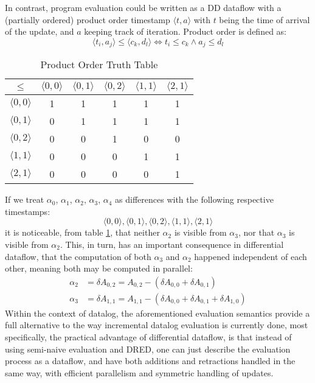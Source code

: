 \documentclass[sigconf,screen,review=false,natbib]{acmart}
\theoremstyle{definition}
\begin{document}
In contrast, program evaluation could be written as a DD dataflow with a (partially ordered) product order timestamp $\langle  t, a \rangle$
with $t$ being the time of arrival of the update, and $a$ keeping track of iteration. Product order is defined as: \[\langle t_i, a_j \rangle \leq \langle c_k, d_l \rangle \iff t_i \leq c_k \wedge a_j \leq d_l\]
\begin{table}
	\caption{Product Order Truth Table}
	\begin{tabular}{|c|c|c|c|c|c|}
		\hline
		$\leq$                 & $\langle 0, 0 \rangle$ & $\langle 0, 1 \rangle$ & $\langle 0, 2 \rangle$ & $\langle 1, 1 \rangle$ & $\langle 2, 1 \rangle$ \\
		\hline
		$\langle 0, 0 \rangle$ & 1                      & 1                      & 1                      & 1                      & 1                      \\
		\hline
		$\langle 0, 1 \rangle$ & 0                      & 1                      & 1                      & 1                      & 1                      \\
		\hline
		$\langle 0, 2 \rangle$ & 0                      & 0                      & 1                      & 0                      & 0                      \\
		\hline
		$\langle 1, 1 \rangle$ & 0                      & 0                      & 0                      & 1                      & 1                      \\
		\hline
		$\langle 2, 1 \rangle$ & 0                      & 0                      & 0                      & 0                      & 1                      \\
		\hline
	\end{tabular}
	\label{tab:prod_order}
\end{table}
If we treat $\alpha_0$, $\alpha_1$, $\alpha_2$, $\alpha_3$, $\alpha_4$ as differences with the following
respective timestamps: \[\langle 0, 0 \rangle, \langle 0, 1 \rangle, \langle 0, 2 \rangle, \langle 1, 1 \rangle, \langle 2, 1 \rangle\]
it is noticeable, from table \ref{tab:prod_order}, that neither $\alpha_2$ is visible from $\alpha_3$, nor that $\alpha_3$ is visible
from $\alpha_2$. This, in turn, has an important consequence in differential dataflow, that the computation of both $\alpha_3$ and
$\alpha_2$ happened independent of each other, meaning both may be computed in parallel:
\begin{align*}
	\alpha_2 & = \delta A_{0, 2} = A_{0, 2} - (\delta A_{0, 0} + \delta A_{0, 1} )                  \\
	\alpha_3 & = \delta A_{1, 1} = A_{1, 1} - (\delta A_{0, 0} + \delta A_{0, 1} + \delta A_{1, 0})
\end{align*}
Within the context of datalog, the aforementioned evaluation semantics provide a full alternative to the way
incremental datalog evaluation is currently done, most specifically, the practical advantage of differential
dataflow, is that instead of using semi-naive evaluation and DRED, one can just describe the evaluation process
as a dataflow, and have both additions and retractions handled in the same way, with efficient parallelism and
symmetric handling of updates.
\end{document}

